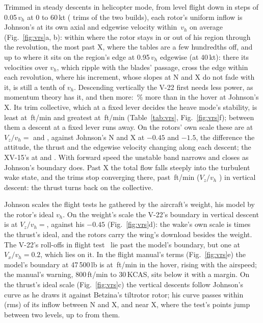 \documentclass[10pt,a4paper,twocolumn]{article}
\begin{document}
Trimmed in steady descents in helicopter mode, from level flight down in steps of 0.05\,$v_h$ at 0 to 60\,kt (\NVrsTrims{} trims of the two
builds), each rotor's uniform inflow is Johnson's at its own axial and edgewise velocity within \NVrsMeanErr\,$v_h$ on average
(Fig.~\ref{fig:vrs}a, b): within \NVrsErrIn{} where the rotor stays in or out of his region through the revolution, the most past X, where
the tables are a few hundredths off, and up to \NVrsErrEdge{} where it sits on the region's edge at 0.95\,$v_h$ edgewise (at 40\,kt): there
its velocities over $v_h$, which ripple with the blades' passage, cross the edge within each revolution, where his increment, whose slopes
at N and X do not fade with it, is still a tenth of $v_h$. Descending vertically the V-22 first needs less power, as momentum theory has it, and then more: \NVrsPow\,\% more than
in the hover at Johnson's X. Its trim collective, which at a fixed lever decides the heave mode's stability, is least at \NVrsLo\,ft/min and
greatest at \NVrsHi\,ft/min (Table~\ref{tab:vrs}, Fig.~\ref{fig:vrs}f); between them a descent at a fixed lever runs away. On the rotors' own
scale these are at $V_z/v_h={}$\NVrsLoZ{} and \NVrsHiZ, against Johnson's N and X at $-0.45$ and $-1.5$, the difference the attitude, the
thrust and the edgewise velocity changing along each descent; the XV-15's at \NVrsLoZX{} and \NVrsHiZX. With forward speed the unstable band narrows and closes as
Johnson's boundary does. Past X the total flow falls steeply into the turbulent wake state, and the trims stop converging there, past
\NVrsLast\,ft/min ($V_z/v_h$ \NVrsLastZ) in vertical descent: the thrust turns back on the collective.

Johnson scales the flight tests he gathered by the aircraft's weight, his model by the rotor's ideal $v_h$. On the weight's scale the V-22's
boundary in vertical descent is at $V_z/v_h={}$\NVrsLoW{}, against his $-0.45$ (Fig.~\ref{fig:vrs}d): the wake's own scale is \NVrsKappa{} times the
thrust's ideal, and the rotors carry the wing's download besides the weight. The V-22's roll-offs in flight test~\cite{hrod} lie past the
model's boundary, but one at $V_x/v_h=0.2$, which lies on it. In the flight manual's terms (Fig.~\ref{fig:vrs}e) the model's boundary at
47\,500\,lb is at \NVrsLo\,ft/min in the hover, rising with the airspeed; the manual's warning, 800\,ft/min to 30\,KCAS, sits below it with a
margin. On the thrust's ideal scale (Fig.~\ref{fig:vrs}c) the vertical descents follow Johnson's curve as he draws it against Betzina's
tiltrotor rotor; his curve passes within \NBetzRmsNX{} (rms) of its inflow between N and X, and near X, where the test's points jump
between two levels, up to \NBetzMax{} from them.
\end{document}
